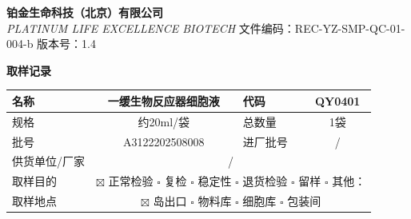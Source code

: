 \documentclass[UTF8,10pt,a4paper,fontset=fandol]{ctexart}
\renewcommand{\arraystretch}{1.15}
\newcommand{\fieldvalue}[1]{#1}
\begin{document}

\newpage

\noindent\textbf{铂金生命科技（北京）有限公司}\\[-2pt]
\textit{PLATINUM LIFE EXCELLENCE BIOTECH}\hfill
文件编码：REC-YZ-SMP-QC-01-004-b \quad 版本号：1.4

\begin{center}
    \textbf{\large 取样记录}
\end{center}

\renewcommand{\arraystretch}{1.65}
\small
\begin{tabularx}{\textwidth}{|p{}|p{}|p{}|p{}|p{}|X|}
\hline
名称 &
\multicolumn{2}{c|}{
\fieldvalue{一缓生物反应器细胞液}
} &
代码 &
\multicolumn{2}{c|}{
\fieldvalue{QY0401}
}
\\ \hline

规格 &
\multicolumn{2}{c|}{
\fieldvalue{约20ml/袋}
} &
总数量 &
\multicolumn{2}{c|}{
\fieldvalue{1袋}
}
\\ \hline

批号 &
\multicolumn{2}{c|}{
\fieldvalue{A3122202508008}
} &
进厂批号 &
\multicolumn{2}{c|}{
\fieldvalue{/}
}
\\ \hline

供货单位/厂家 &
\multicolumn{5}{c|}{
\fieldvalue{/}
}
\\ \hline

取样目的 &
\multicolumn{5}{c|}{
\fieldvalue{$\boxtimes$ 正常检验}\quad
$\square$ 复检\quad
$\square$ 稳定性
\newline
\hspace*{1.8em}$\square$ 退货检验\quad
$\square$ 留样\quad
$\square$ 其他：\underline{\hspace{3em}}}
\\ \hline

取样地点 &
\multicolumn{5}{c|}{
\fieldvalue{$\boxtimes$ 岛出口}\quad
$\square$ 物料库\quad
$\square$ 细胞库\quad
$\square$ 包装间
}
\\ \hline


\end{tabularx}
\end{document}
